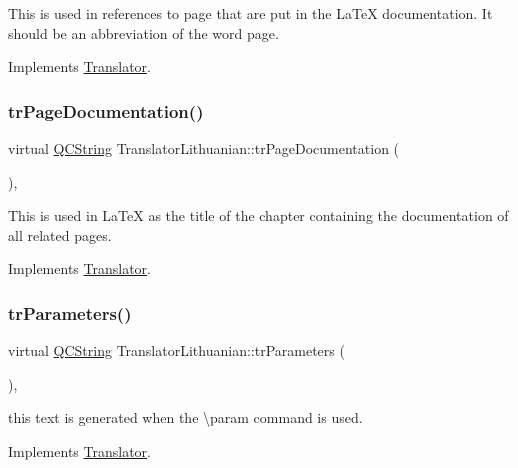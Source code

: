 This is used in references to page that are put in the La\+TeX documentation. It should be an abbreviation of the word page. 

Implements \mbox{\hyperlink{class_translator}{Translator}}.

\mbox{\label{class_translator_lithuanian_ae4f6ad3986a3ebbbbacd789933e50878}} 
\subsubsection{\texorpdfstring{trPageDocumentation()}{trPageDocumentation()}}
{\footnotesize\ttfamily virtual \mbox{\hyperlink{class_q_c_string}{Q\+C\+String}} Translator\+Lithuanian\+::tr\+Page\+Documentation (\begin{DoxyParamCaption}{ }\end{DoxyParamCaption})\hspace{0.3cm}{\ttfamily [inline]}, {\ttfamily [virtual]}}

This is used in La\+TeX as the title of the chapter containing the documentation of all related pages. 

Implements \mbox{\hyperlink{class_translator}{Translator}}.

\mbox{\label{class_translator_lithuanian_a16a87d961b1d1ff76125a8694e058436}} 
\subsubsection{\texorpdfstring{trParameters()}{trParameters()}}
{\footnotesize\ttfamily virtual \mbox{\hyperlink{class_q_c_string}{Q\+C\+String}} Translator\+Lithuanian\+::tr\+Parameters (\begin{DoxyParamCaption}{ }\end{DoxyParamCaption})\hspace{0.3cm}{\ttfamily [inline]}, {\ttfamily [virtual]}}

this text is generated when the \textbackslash{}param command is used. 

Implements \mbox{\hyperlink{class_translator}{Translator}}.

